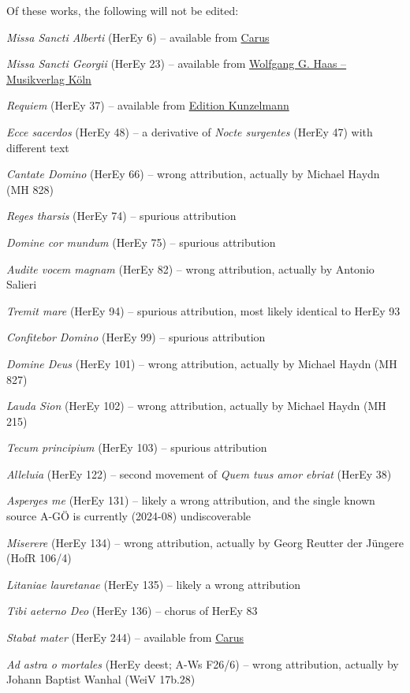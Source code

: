\documentclass{ees}
\begin{document}
Of these works, the following will not be edited:
\begin{bulletlist}
  \item \textit{Missa Sancti Alberti} (HerEy 6) – available from \href{https://www.carus-verlag.com/musiknoten-und-aufnahmen/eybler-missa-sancti-alberti-2708400.html}{Carus}
  \item \textit{Missa Sancti Georgii} (HerEy 23) – available from \href{https://haas-koeln.de/epages/eb9c158e-5223-47bf-ab0c-87e8cfad2c49.sf/de_DE/?ObjectPath=/Shops/eb9c158e-5223-47bf-ab0c-87e8cfad2c49/Products/%22ISMN%20M-50000-256-7%22}{Wolfgang G. Haas – Musikverlag Köln}
  \item \textit{Requiem} (HerEy 37) – available from \href{https://www.kunzelmann.ch/en/requiem-oct-10287}{Edition Kunzelmann}
  \item \textit{Ecce sacerdos} (HerEy 48) – a derivative of \textit{Nocte surgentes} (HerEy 47) with different text
  \item \textit{Cantate Domino} (HerEy 66) – wrong attribution, actually by Michael Haydn (MH 828)
  \item \textit{Reges tharsis} (HerEy 74) – spurious attribution
  \item \textit{Domine cor mundum} (HerEy 75) – spurious attribution
  \item \textit{Audite vocem magnam} (HerEy 82) – wrong attribution, actually by Antonio Salieri
  \item \textit{Tremit mare} (HerEy 94) – spurious attribution, most likely identical to HerEy 93
  \item \textit{Confitebor Domino} (HerEy 99) – spurious attribution
  \item \textit{Domine Deus} (HerEy 101) – wrong attribution, actually by Michael Haydn (MH 827)
  \item \textit{Lauda Sion} (HerEy 102) – wrong attribution, actually by Michael Haydn (MH 215)
  \item \textit{Tecum principium} (HerEy 103) – spurious attribution
  \item \textit{Alleluia} (HerEy 122) – second movement of \textit{Quem tuus amor ebriat} (HerEy 38)
  \item \textit{Asperges me} (HerEy 131) – likely a wrong attribution, and the single known source A-GÖ is currently (2024-08) undiscoverable
  \item \textit{Miserere} (HerEy 134) – wrong attribution, actually by Georg Reutter der Jüngere (HofR 106/4)
  \item \textit{Litaniae lauretanae} (HerEy 135) – likely a wrong attribution
  \item \textit{Tibi aeterno Deo} (HerEy 136) – chorus of HerEy 83
  \item \textit{Stabat mater} (HerEy 244) – available from \href{https://www.carus-verlag.com/musiknoten-und-aufnahmen/giovanni-battista-pergolesi-otto-nicolai-arr-ignaz-xaver-ritter-von-seyfried-arr-joseph-leopold-eybler-arr-stabat-mater-9700300.html?listtype=search&searchparam=eybler}{Carus}
  \item \textit{Ad astra o mortales} (HerEy deest; A-Ws F26/6) – wrong attribution, actually by Johann Baptist Wanhal (WeiV 17b.28)
\end{bulletlist}
\end{document}
